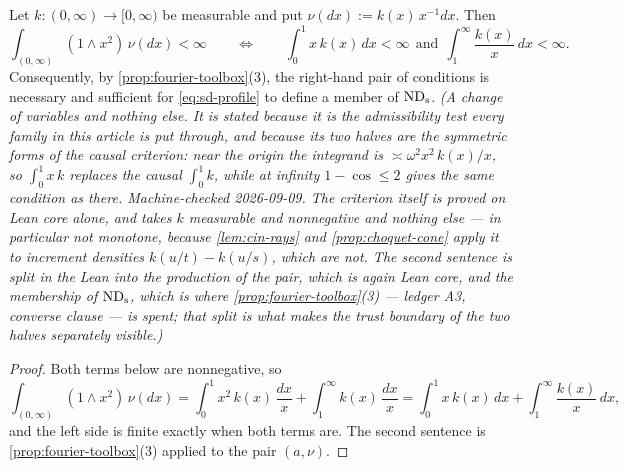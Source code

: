 \begin{lemma}\label{lem:profile-integrability}
\leanok
Let $k : (0,\infty) \to [0,\infty)$ be measurable and put $\nu(dx) := k(x)\,x^{-1}dx$. Then
\[
  \int_{(0,\infty)} (1 \wedge x^2)\,\nu(dx) < \infty
  \qquad\Longleftrightarrow\qquad
  \int_0^1 x\,k(x)\,dx < \infty \ \ \text{and} \ \
  \int_1^\infty \frac{k(x)}{x}\,dx < \infty .
\]
Consequently, by \ref{prop:fourier-toolbox}(3), the right-hand pair of conditions is necessary
and sufficient for \ref{eq:sd-profile} to define a member of $\mathrm{ND}_{\mathrm{s}}$.
\statusT\quad\emph{(A change of variables and nothing else. It is stated because it is the
admissibility test every family in this article is put through, and because its two halves are
the symmetric forms of the causal criterion: near the origin the integrand is
$\asymp \omega^2x^2\,k(x)/x$, so $\int_0^1 x\,k$ replaces the causal $\int_0^1 k$, while at
infinity $1 - \cos \le 2$ gives the same condition as there. Machine-checked 2026-09-09. The
criterion itself is proved on Lean core alone, and takes $k$ measurable and nonnegative and
\emph{nothing else} --- in particular not monotone, because
\ref{lem:cin-rays} and \ref{prop:choquet-cone} apply it to increment densities
$k(u/t) - k(u/s)$, which are not. The second sentence is split in the Lean into the production
of the pair, which is again Lean core, and the membership of $\mathrm{ND}_{\mathrm{s}}$, which is where
\ref{prop:fourier-toolbox}(3) --- ledger A3, converse clause --- is spent; that split is what
makes the trust boundary of the two halves separately visible.)}
\end{lemma}

\begin{proof}\leanok
Both terms below are nonnegative, so
\[
  \int_{(0,\infty)}(1 \wedge x^2)\,\nu(dx)
  = \int_0^1 x^2\,k(x)\,\frac{dx}{x} + \int_1^\infty k(x)\,\frac{dx}{x}
  = \int_0^1 x\,k(x)\,dx + \int_1^\infty \frac{k(x)}{x}\,dx,
\]
and the left side is finite exactly when both terms are. The second sentence is
\ref{prop:fourier-toolbox}(3) applied to the pair $(a,\nu)$.
\end{proof}

